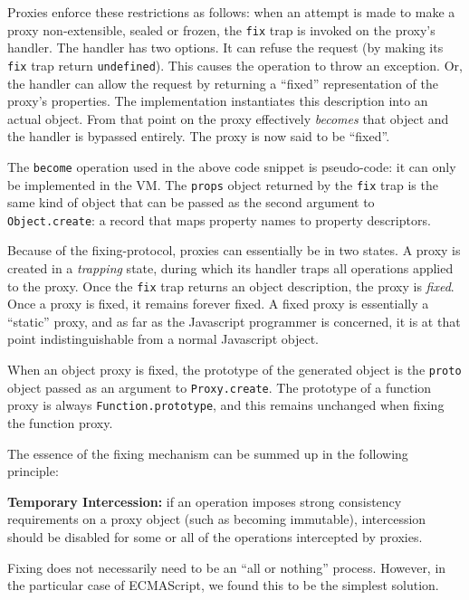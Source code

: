 \documentclass{sig-alternate}
\begin{document}
Proxies enforce these restrictions as follows: when an attempt is made to make a proxy non-extensible, sealed or frozen, the \texttt{fix} trap is invoked on the proxy's handler. The handler has two options. It can refuse the request (by making its \texttt{fix} trap return \texttt{undefined}). This causes the operation to throw an exception. Or, the handler can allow the request by returning a ``fixed'' representation of the proxy's properties. The implementation instantiates this description into an actual object. From that point on the proxy effectively \emph{becomes} that object and the handler is bypassed entirely. The proxy is now said to be ``fixed''.

The \texttt{become} operation used in the above code snippet is pseudo-code: it can only be implemented in the VM. The \texttt{props} object returned by the \texttt{fix} trap is the same kind of object that can be passed as the second argument to \texttt{Object.create}: a record that maps property names to property descriptors.

Because of the fixing-protocol, proxies can essentially be in two states. A proxy is created in a \emph{trapping} state, during which its handler traps all operations applied to the proxy. Once the \texttt{fix} trap returns an object description, the proxy is \emph{fixed}. Once a proxy is fixed, it remains forever fixed. A fixed proxy is essentially a ``static'' proxy, and as far as the Javascript programmer is concerned, it is at that point indistinguishable from a normal Javascript object.

When an object proxy is fixed, the prototype of the generated object is the \texttt{proto} object passed as an argument to \texttt{Proxy.create}. The prototype of a function proxy is always \texttt{Function.prototype}, and this remains unchanged when fixing the function proxy.

The essence of the fixing mechanism can be summed up in the following principle:

\textbf{Temporary Intercession:} if an operation imposes strong consistency requirements on a proxy object (such as becoming immutable), intercession should be disabled for some or all of the operations intercepted by proxies.

Fixing does not necessarily need to be an ``all or nothing'' process. However, in the particular case of ECMAScript, we found this to be the simplest solution.
\end{document}
